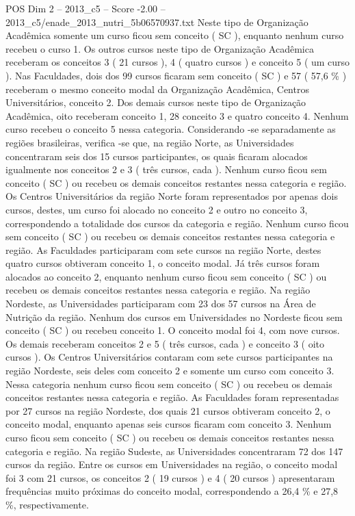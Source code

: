 \begin{textsample}{POS Dim 2 – 2013\_c5 – Score -2.00 – 2013\_c5/enade\_2013\_nutri\_5b06570937.txt}
Neste tipo de Organização Acadêmica somente um curso ficou sem conceito ( SC ), enquanto nenhum curso recebeu o curso 1.
Os outros cursos neste tipo de Organização Acadêmica receberam os conceitos 3 ( 21 cursos ), 4 ( quatro cursos ) e conceito 5 ( um curso ).
Nas Faculdades, dois dos 99 cursos ficaram sem conceito ( SC ) e 57 ( 57,6 \% ) receberam o mesmo conceito modal da Organização Acadêmica, Centros Universitários, conceito 2.
Dos demais cursos neste tipo de Organização Acadêmica, oito receberam conceito 1, 28 conceito 3 e quatro conceito 4.
Nenhum curso recebeu o conceito 5 nessa categoria.
Considerando -se separadamente as regiões brasileiras, verifica -se que, na região Norte, as Universidades concentraram seis dos 15 cursos participantes, os quais ficaram alocados igualmente nos conceitos 2 e 3 ( três cursos, cada ).
Nenhum curso ficou sem conceito ( SC ) ou recebeu os demais conceitos restantes nessa categoria e região.
Os Centros Universitários da região Norte foram representados por apenas dois cursos, destes, um curso foi alocado no conceito 2 e outro no conceito 3, correspondendo a totalidade dos cursos da categoria e região.
Nenhum curso ficou sem conceito ( SC ) ou recebeu os demais conceitos restantes nessa categoria e região.
As Faculdades participaram com sete cursos na região Norte, destes quatro cursos obtiveram conceito 1, o conceito modal.
Já três cursos foram alocados ao conceito 2, enquanto nenhum curso ficou sem conceito ( SC ) ou recebeu os demais conceitos restantes nessa categoria e região.
Na região Nordeste, as Universidades participaram com 23 dos 57 cursos na Área de Nutrição da região.
Nenhum dos cursos em Universidades no Nordeste ficou sem conceito ( SC ) ou recebeu conceito 1.
O conceito modal foi 4, com nove cursos.
Os demais receberam conceitos 2 e 5 ( três cursos, cada ) e conceito 3 ( oito cursos ).
Os Centros Universitários contaram com sete cursos participantes na região Nordeste, seis deles com conceito 2 e somente um curso com conceito 3.
Nessa categoria nenhum curso ficou sem conceito ( SC ) ou recebeu os demais conceitos restantes nessa categoria e região.
As Faculdades foram representadas por 27 cursos na região Nordeste, dos quais 21 cursos obtiveram conceito 2, o conceito modal, enquanto apenas seis cursos ficaram com conceito 3.
Nenhum curso ficou sem conceito ( SC ) ou recebeu os demais conceitos restantes nessa categoria e região.
Na região Sudeste, as Universidades concentraram 72 dos 147 cursos da região.
Entre os cursos em Universidades na região, o conceito modal foi 3 com 21 cursos, os conceitos 2 ( 19 cursos ) e 4 ( 20 cursos ) apresentaram frequências muito próximas do conceito modal, correspondendo a 26,4 \% e 27,8 \%, respectivamente.

\end{textsample}
